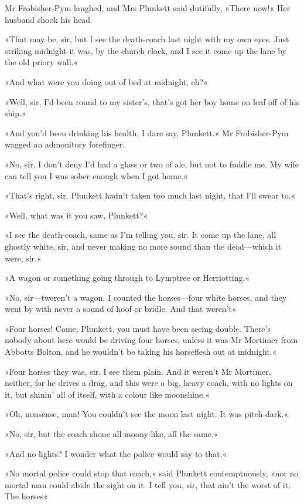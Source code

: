 Mr Frobisher-Pym laughed, and Mrs Plunkett said dutifully, »There now!« Her husband shook his head.

»That may be, sir, but I see the death-coach last night with my own eyes. Just striking midnight it was, by the church clock, and I see it come up the lane by the old priory wall.«

»And what were you doing out of bed at midnight, eh?«

»Well, sir, I'd been round to my sister's, that's got her boy home on leaf off of his ship.«

»And you'd been drinking his health, I dare say, Plunkett.« Mr Frobisher-Pym wagged an admonitory forefinger.

»No, sir, I don't deny I'd had a glass or two of ale, but not to fuddle me. My wife can tell you I was sober enough when I got home.«

»That's right, sir. Plunkett hadn't taken too much last night, that I'll swear to.«

»Well, what was it you saw, Plunkett?«

»I see the death-coach, same as I'm telling you, sir. It come up the lane, all ghostly white, sir, and never making no more sound than the dead—which it were, sir.«

»A wagon or something going through to Lymptree or Herriotting.«

»No, sir—tweren't a wagon. I counted the horses—four white horses, and they went by with never a sound of hoof or bridle. And that weren't\longdash«

»Four horses! Come, Plunkett, you must have been seeing double. There's nobody about here would be driving four horses, unless it was Mr Mortimer from Abbotts Bolton, and he wouldn't be taking his horseflesh out at midnight.«

»Four horses they was, sir. I see them plain. And it weren't Mr Mortimer, neither, for he drives a drag, and this were a big, heavy coach, with no lights on it, but shinin' all of itself, with a colour like moonshine.«

»Oh, nonsense, man! You couldn't see the moon last night. It was pitch-dark.«

»No, sir, but the coach shone all moony-like, all the same.«

»And no lights? I wonder what the police would say to that.«

»No mortal police could stop that coach,« said Plunkett contemptuously, »nor no mortal man could abide the sight on it. I tell you, sir, that ain't the worst of it. The horses\longdash«

